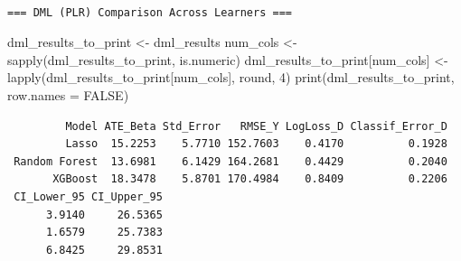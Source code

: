 \documentclass[
  letterpaper,
  DIV=11,
  numbers=noendperiod]{scrartcl}
\newenvironment{Shaded}{\begin{snugshade}}{\end{snugshade}}
\newcommand{\AttributeTok}[1]{\textcolor[rgb]{0.40,0.45,0.13}{#1}}
\newcommand{\CommentTok}[1]{\textcolor[rgb]{0.37,0.37,0.37}{#1}}
\newcommand{\ConstantTok}[1]{\textcolor[rgb]{0.56,0.35,0.01}{#1}}
\newcommand{\ControlFlowTok}[1]{\textcolor[rgb]{0.00,0.23,0.31}{\textbf{#1}}}
\newcommand{\DecValTok}[1]{\textcolor[rgb]{0.68,0.00,0.00}{#1}}
\newcommand{\FunctionTok}[1]{\textcolor[rgb]{0.28,0.35,0.67}{#1}}
\newcommand{\NormalTok}[1]{\textcolor[rgb]{0.00,0.23,0.31}{#1}}
\newcommand{\OtherTok}[1]{\textcolor[rgb]{0.00,0.23,0.31}{#1}}
\newcommand{\SpecialCharTok}[1]{\textcolor[rgb]{0.37,0.37,0.37}{#1}}
\newcommand{\StringTok}[1]{\textcolor[rgb]{0.13,0.47,0.30}{#1}}
\begin{document}
\begin{verbatim}

=== DML (PLR) Comparison Across Learners ===
\end{verbatim}

\begin{Shaded}
\begin{Highlighting}[]
\NormalTok{dml\_results\_to\_print }\OtherTok{\textless{}{-}}\NormalTok{ dml\_results}
\NormalTok{num\_cols }\OtherTok{\textless{}{-}} \FunctionTok{sapply}\NormalTok{(dml\_results\_to\_print, is.numeric)}
\NormalTok{dml\_results\_to\_print[num\_cols] }\OtherTok{\textless{}{-}} \FunctionTok{lapply}\NormalTok{(dml\_results\_to\_print[num\_cols], round, }\DecValTok{4}\NormalTok{)}
\FunctionTok{print}\NormalTok{(dml\_results\_to\_print, }\AttributeTok{row.names =} \ConstantTok{FALSE}\NormalTok{)}
\end{Highlighting}
\end{Shaded}

\begin{verbatim}
         Model ATE_Beta Std_Error   RMSE_Y LogLoss_D Classif_Error_D
         Lasso  15.2253    5.7710 152.7603    0.4170          0.1928
 Random Forest  13.6981    6.1429 164.2681    0.4429          0.2040
       XGBoost  18.3478    5.8701 170.4984    0.8409          0.2206
 CI_Lower_95 CI_Upper_95
      3.9140     26.5365
      1.6579     25.7383
      6.8425     29.8531
\end{verbatim}

\begin{Shaded}
\end{Shaded}
\end{document}
